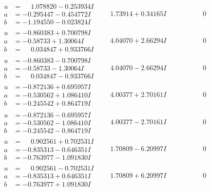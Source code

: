 \documentclass[1p]{elsarticle_modified}
\theoremstyle{definition}
\begin{document}
$$\begin{array}{c|c|c}
\begin{aligned}
u &= \phantom{-}1.078820 - 0.253934 I \\
a &= -0.295447 - 0.454772 I \\
b &= -1.194550 - 0.023824 I\end{aligned}
 & \phantom{-}1.73914 + 0.34165 I & \phantom{-0.000000 } 0 \\ \hline\begin{aligned}
u &= -0.860383 + 0.700798 I \\
a &= -0.58733 + 1.30064 I \\
b &= \phantom{-}0.034847 + 0.933766 I\end{aligned}
 & \phantom{-}4.04070 + 2.66294 I & \phantom{-0.000000 } 0 \\ \hline\begin{aligned}
u &= -0.860383 - 0.700798 I \\
a &= -0.58733 - 1.30064 I \\
b &= \phantom{-}0.034847 - 0.933766 I\end{aligned}
 & \phantom{-}4.04070 - 2.66294 I & \phantom{-0.000000 } 0 \\ \hline\begin{aligned}
u &= -0.872136 + 0.695957 I \\
a &= -0.530562 + 1.086410 I \\
b &= -0.245542 + 0.864719 I\end{aligned}
 & \phantom{-}4.00377 + 2.70161 I & \phantom{-0.000000 } 0 \\ \hline\begin{aligned}
u &= -0.872136 - 0.695957 I \\
a &= -0.530562 - 1.086410 I \\
b &= -0.245542 - 0.864719 I\end{aligned}
 & \phantom{-}4.00377 - 2.70161 I & \phantom{-0.000000 } 0 \\ \hline\begin{aligned}
u &= \phantom{-}0.902561 + 0.702531 I \\
a &= -0.835313 - 0.646351 I \\
b &= -0.763977 - 1.091830 I\end{aligned}
 & \phantom{-}1.70809 - 6.20997 I & \phantom{-0.000000 } 0 \\ \hline\begin{aligned}
u &= \phantom{-}0.902561 - 0.702531 I \\
a &= -0.835313 + 0.646351 I \\
b &= -0.763977 + 1.091830 I\end{aligned}
 & \phantom{-}1.70809 + 6.20997 I & \phantom{-0.000000 } 0\\

\end{array}$$
\end{document}
